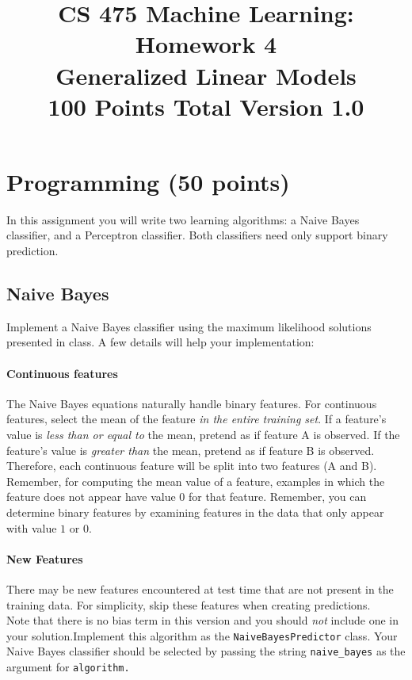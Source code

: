 \documentclass[11pt]{article}
\title{CS 475 Machine Learning: Homework 4\\Generalized Linear Models\\
100 Points Total \hspace{1cm} Version 1.0}
\author{}
\date{}
\newcommand{\code}[1]{{\footnotesize \tt #1}}
\begin{document}
\large
\maketitle
\thispagestyle{headings}

\vspace{-.5in}
\section{Programming (50 points)}
In this assignment you will write two learning algorithms: a Naive Bayes classifier, and a Perceptron classifier. Both classifiers need only support binary prediction.

\subsection{Naive Bayes}
Implement a Naive Bayes classifier using the maximum likelihood solutions presented in class. A few details will help your
implementation:

\paragraph{Continuous features}
The Naive Bayes equations naturally handle binary features. 
For continuous features, select the mean of the feature {\em in the entire training set}. If a feature's value is \emph{less than or equal to} the mean, pretend as if feature A is observed. If the feature's value is \emph{greater than} the mean, pretend as if feature B is observed. Therefore, each continuous feature will be split into two features (A and B). Remember, for computing the mean value of a feature, examples in which the feature does not appear have value $0$ for that feature. Remember, you can determine binary features by examining features in the data that only appear with value $1$ or $0$.


\paragraph{New Features} There may be new features encountered at test time that are not present in the training data. For simplicity, skip these features when creating predictions.\\


Note that there is no bias term in this version and you should \emph{not} include one in your solution.Implement this algorithm as the \code{NaiveBayesPredictor} class. Your Naive Bayes classifier should be selected by passing the string {\tt naive\_bayes} as the argument for {\tt algorithm.} 
\end{document}
